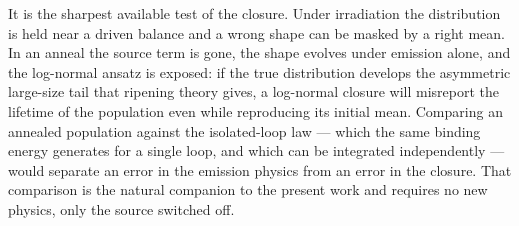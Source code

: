 It is the sharpest available test of the closure. Under irradiation the
distribution is held near a driven balance and a wrong shape can be masked by a
right mean. In an anneal the source term is gone, the shape evolves under
emission alone, and the log-normal ansatz is exposed: if the true distribution
develops the asymmetric large-size tail that ripening theory gives, a log-normal
closure will misreport the lifetime of the population even while reproducing its
initial mean. Comparing an annealed population against the isolated-loop law ---
which the same binding energy generates for a single loop, and which can be
integrated independently --- would separate an error in the emission physics
from an error in the closure. That comparison is the natural companion to the
present work and requires no new physics, only the source switched off.
